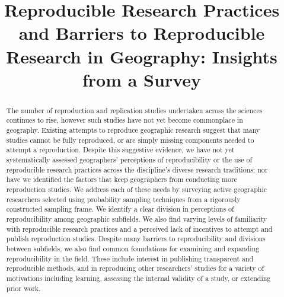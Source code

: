 \documentclass[]{interact}
\theoremstyle{plain}%
\theoremstyle{definition}
\theoremstyle{remark}
\begin{document}

\title{Reproducible Research Practices and Barriers to Reproducible Research in Geography: Insights from a Survey}

\author{
}

\maketitle

\begin{abstract}
The number of reproduction and replication studies undertaken across the sciences continues to rise, however such studies have not yet become commonplace in geography. 
Existing attempts to reproduce geographic research suggest that many studies cannot be fully reproduced, or are simply missing components needed to attempt a reproduction. 
Despite this suggestive evidence, we have not yet systematically assessed geographers' perceptions of reproducibility or the use of reproducible research practices across the discipline's diverse research traditions; nor have we identified the factors that keep geographers from conducting more reproduction studies.
We address each of these needs by surveying active geographic researchers selected using probability sampling techniques from a rigorously constructed sampling frame.
We identify a clear division in perceptions of reproducibility among geographic subfields. 
We also find varying levels of familiarity with reproducible research practices and a perceived lack of incentives to attempt and publish reproduction studies. 
Despite many barriers to reproducibility and divisions between subfields, we also find common foundations for examining and expanding reproducibility in the field.
These include interest in publishing transparent and reproducible methods, and in reproducing other researchers' studies for a variety of motivations including learning, assessing the internal validity of a study, or extending prior work.


\end{abstract}
\end{document}

